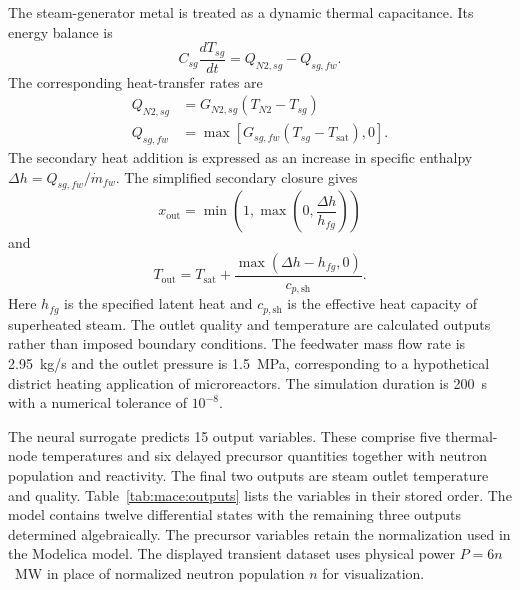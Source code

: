 The steam-generator metal is treated as a dynamic thermal capacitance. Its energy balance is
\begin{equation}
 C_{sg}\frac{dT_{sg}}{dt}=Q_{N2,sg}-Q_{sg,fw}.
 \label{eq:mace:steammetal}
\end{equation}
The corresponding heat-transfer rates are
\begin{equation}
 \begin{aligned}
 Q_{N2,sg}&=G_{N2,sg}(T_{N2}-T_{sg})\\
 Q_{sg,fw}&=\max\!\left[G_{sg,fw}(T_{sg}-T_{\mathrm{sat}}),0\right].
 \end{aligned}
 \label{eq:mace:steamflows}
\end{equation}
The secondary heat addition is expressed as an increase in specific enthalpy $\Delta h=Q_{sg,fw}/\dot m_{fw}$. The simplified secondary closure gives
\begin{equation}
 x_{\mathrm{out}}=
 \min\left(1,\max\left(0,\frac{\Delta h}{h_{fg}}\right)\right)
 \label{eq:mace:quality}
\end{equation}
and
\begin{equation}
 T_{\mathrm{out}}=
 T_{\mathrm{sat}}+\frac{\max(\Delta h-h_{fg},0)}{c_{p,\mathrm{sh}}}.
 \label{eq:mace:steamclosure}
\end{equation}
Here $h_{fg}$ is the specified latent heat and $c_{p,\mathrm{sh}}$ is the effective heat capacity of superheated steam. The outlet quality and temperature are calculated outputs rather than imposed boundary conditions. The feedwater mass flow rate is 2.95~kg/s and the outlet pressure is 1.5~MPa, corresponding to a hypothetical district heating application of microreactors. The simulation duration is 200~s with a numerical tolerance of $10^{-8}$.

The neural surrogate predicts 15 output variables. These comprise five thermal-node temperatures and six delayed precursor quantities together with neutron population and reactivity. The final two outputs are steam outlet temperature and quality. Table~\ref{tab:mace:outputs} lists the variables in their stored order. The model contains twelve differential states with the remaining three outputs determined algebraically. The precursor variables retain the normalization used in the Modelica model. The displayed transient dataset uses physical power $P=6n$~MW in place of normalized neutron population $n$ for visualization.

